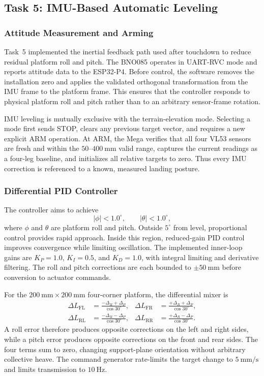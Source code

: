 \documentclass{engr1000j-s2}
\begin{document}
\newpage

\subsection{Task 5: IMU-Based Automatic Leveling}
\label{task:imu-leveling}

\subsubsection{Attitude Measurement and Arming}

Task~5 implemented the inertial feedback path used after touchdown to reduce residual platform roll and pitch. The BNO085 operates in UART-RVC mode and reports attitude data to the ESP32-P4. Before control, the software removes the installation zero and applies the validated orthogonal transformation from the IMU frame to the platform frame. This ensures that the controller responds to physical platform roll and pitch rather than to an arbitrary sensor-frame rotation.

IMU leveling is mutually exclusive with the terrain-elevation mode. Selecting a mode first sends STOP, clears any previous target vector, and requires a new explicit ARM operation. At ARM, the Mega verifies that all four VL53 sensors are fresh and within the $50$--$400~\mathrm{mm}$ valid range, captures the current readings as a four-leg baseline, and initializes all relative targets to zero. Thus every IMU correction is referenced to a known, measured landing posture.

\subsubsection{Differential PID Controller}

The controller aims to achieve
\[
|\phi|<1.0^\circ,
\qquad
|\theta|<1.0^\circ,
\]
where $\phi$ and $\theta$ are platform roll and pitch. Outside $5^\circ$ from level, proportional control provides rapid approach. Inside this region, reduced-gain PID control improves convergence while limiting oscillation. The implemented inner-loop gains are $K_P=1.0$, $K_I=0.5$, and $K_D=1.0$, with integral limiting and derivative filtering. The roll and pitch corrections are each bounded to $\pm50~\mathrm{mm}$ before conversion to actuator commands.

For the $200~\mathrm{mm}\times200~\mathrm{mm}$ four-corner platform, the differential mixer is
\[
\begin{aligned}
\Delta L_{\mathrm{FL}}&=\frac{-\Delta_R+\Delta_P}{\cos30^\circ}, &
\Delta L_{\mathrm{FR}}&=\frac{+\Delta_R+\Delta_P}{\cos30^\circ},\\
\Delta L_{\mathrm{RL}}&=\frac{-\Delta_R-\Delta_P}{\cos30^\circ}, &
\Delta L_{\mathrm{RR}}&=\frac{+\Delta_R-\Delta_P}{\cos30^\circ}.
\end{aligned}
\]
A roll error therefore produces opposite corrections on the left and right sides, while a pitch error produces opposite corrections on the front and rear sides. The four terms sum to zero, changing support-plane orientation without arbitrary collective heave. The command generator rate-limits the target change to $5~\mathrm{mm/s}$ and limits transmission to $10~\mathrm{Hz}$.
\end{document}
